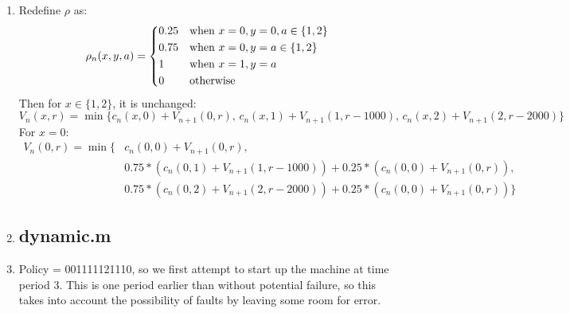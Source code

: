 \documentclass[10pt,a4paper]{article}
\begin{document}
\begin{enumerate}
	\item Redefine \(\rho\) as: \\
	\[
	\rho_n(x, y, a) = \begin{dcases*}
	0.25 & when $x=0, y=0, a \in \{1, 2\}$ \\
	0.75 & when $x=0, y=a \in \{1, 2\}$ \\
	1 & when $x=1, y=a$ \\
	0 & otherwise
	\end{dcases*}
	\]
	Then for \(x \in \{1, 2\}\), it is unchanged:
	\begin{equation*}
	V_n(x, r) = \min\bigg\{c_n(x, 0) + V_{n+1}(0, r),\, c_n(x, 1) + V_{n+1}(1, r-1000),\, c_n(x, 2) + V_{n+1}(2, r-2000)\bigg\}
	\end{equation*}
	For \(x=0\):
	\begin{align*}
	V_n(0, r) = \min\bigg\{&c_n(0, 0) + V_{n+1}(0, r),\\
	&0.75*(c_n(0, 1) + V_{n+1}(1, r-1000)) + 0.25*(c_n(0, 0) + V_{n+1}(0, r)),\\
	&0.75*(c_n(0, 2) + V_{n+1}(2, r-2000)) + 0.25*(c_n(0, 0) + V_{n+1}(0, r))
	\bigg\}
	\end{align*}
	
	\newpage
	\item \subsection*{dynamic.m} 
	
	\newpage
	\item Policy = 001111121110, so we first attempt to start up the machine at time period 3. This is one period earlier than without potential failure, so this takes into account the possibility of faults by leaving some room for error.

\end{enumerate}
\end{document}
